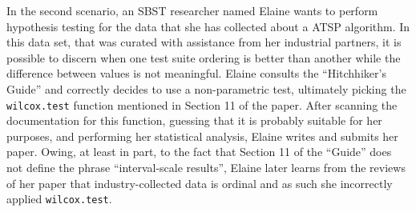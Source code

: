 In the second scenario, an SBST researcher named Elaine wants to perform hypothesis testing for the data that she has
collected about a ATSP algorithm. In this data set, that was curated with assistance from her industrial partners, it is
possible to discern when one test suite ordering is better than another while the difference between values is not
meaningful. Elaine consults the ``Hitchhiker's Guide'' and correctly decides to use a non-parametric test, ultimately
picking the {\tt wilcox.test} function mentioned in Section 11 of the paper. After scanning the documentation for this
function, guessing that it is probably suitable for her purposes, and performing her statistical analysis, Elaine writes and
submits her paper. Owing, at least in part, to the fact that Section 11 of the ``Guide'' does not define the phrase
``interval-scale results'', Elaine later learns from the reviews of her paper that industry-collected data is ordinal and
as such she incorrectly applied {\tt wilcox.test}.


